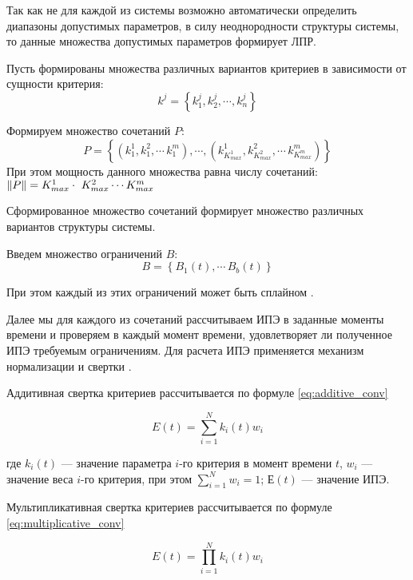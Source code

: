 Так как не для каждой из системы возможно автоматически определить диапазоны допустимых параметров, 
в силу неоднородности структуры системы, то данные множества допустимых параметров формирует ЛПР.

Пусть формированы множества различных вариантов критериев в зависимости от сущности критерия:
\begin{equation}
    k^j=\left\{ k_1^j,k_2^j, \cdots ,k_n^j \right\}
\end{equation}

Формируем множество сочетаний $P$: 
\begin{equation}
    P=\left\{ (k^1_1, k^2_1, \cdots\, k^m_1), \cdots , (k^1_{K^1_{max}}, k^2_{K^2_{max}}, \cdots\, k^m_{K^m_{max}}) \right\}
\end{equation}
При этом мощность данного множества равна числу сочетаний: $ \norm{P} = K^1_{max} \cdot \ K^2_{max} \cdots  K^m_{max} $

Сформированное множество сочетаний формирует множество различных вариантов структуры системы.

Введем множество ограничений $B$:
\begin{equation}
    B = \left\{ B_1(t),\cdots\, B_b(t) \right\} 
\end{equation}

При этом каждый из этих ограничений может быть сплайном \cite{Degradation}.

Далее мы для каждого из сочетаний рассчитываем ИПЭ в заданные моменты времени и проверяем в каждый момент времени, удовлетворяет ли полученное ИПЭ требуемым ограничениям.
Для расчета ИПЭ применяется механизм нормализации и свертки \cite{Degradation}.

Аддитивная свертка критериев рассчитывается по формуле \ref{eq:additive_conv}

\begin{equation}
    \label{eq:additive_conv}
    E(t) = \sum^N_{i=1} k_i(t) w_i
\end{equation}
\vspace{1em}

\noindent
где $k_i(t)$ --- значение параметра $i$-го критерия в момент времени $t$,
$w_i$ --- значение веса $i$-го критерия, при этом $\sum^N_{i=1} w_i = 1$; 
$Е(t)$ --- значение ИПЭ.

Мультипликативная свертка критериев рассчитывается по формуле \ref{eq:multiplicative_conv}

\begin{equation}
    \label{eq:multiplicative_conv}
    E(t) = \prod^N_{i=1} k_i(t) w_i 
\end{equation}
\vspace{1em}


